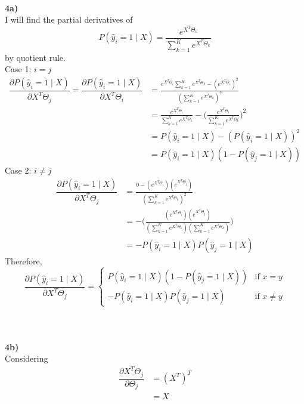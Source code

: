 \documentclass[12pt]{article}
\begin{document}
\paragraph{\\}
\textbf{4a)}\\
I will find the partial derivatives of 
\[P(\hat{y}_{i} = 1\mid X) = \frac{e^{X^{T}\Theta_{i}}}{\sum_{k=1}^{K}e^{X^{T}\Theta_{k}}} \]
by quotient rule.\\[0.1in]
Case 1: $i = j$\\
\begin{align*}
\dfrac{\partial P(\hat{y}_{i} = 1\mid X)}{\partial X^{T}\Theta_{j}}= \dfrac{\partial P(\hat{y}_{i} = 1\mid X)}{\partial X^{T}\Theta_{i}} &= \frac{e^{X^{T}\Theta_{i}}\sum_{k=1}^{K}e^{X^{T}\Theta_{k}} - (e^{X^{T}\Theta_{i}})^{2}}{(\sum_{k=1}^{K}e^{X^{T}\Theta_{k}})^{2}}\\
&= \frac{e^{X^{T}\Theta_{i}}}{\sum_{k=1}^{K}e^{X^{T}\Theta_{k}}} - \Bigg(\frac{e^{X^{T}\Theta_{i}}}{\sum_{k=1}^{K}e^{X^{T}\Theta_{k}}}\Bigg)^{2}\\
&=  P(\hat{y}_{i} = 1\mid X) - ( P(\hat{y}_{i} = 1\mid X))^{2}\\
&=  P(\hat{y}_{i} = 1\mid X)(1 -  P(\hat{y}_{j} = 1\mid X))
\end{align*}
Case 2: $i \neq j$
\begin{align*}
\dfrac{\partial P(\hat{y}_{i} = 1\mid X)}{\partial X^{T}\Theta_{j}} &= \frac{0 - (e^{X^{T}\Theta_{i}})(e^{X^{T}\Theta_{j}})}{(\sum_{k=1}^{K}e^{X^{T}\Theta_{k}})^{2}}\\
&=  - \Bigg(\frac{(e^{X^{T}\Theta_{i}})(e^{X^{T}\Theta_{j}})}{(\sum_{k=1}^{K}e^{X^{T}\Theta_{k}})(\sum_{k=1}^{K}e^{X^{T}\Theta_{k}})}\Bigg)\\
&= - P(\hat{y}_{i} = 1\mid X) P(\hat{y}_{j} = 1\mid X)
\end{align*}
Therefore,\\
\[ \dfrac{\partial P(\hat{y}_{i} = 1\mid X)}{\partial X^{T}\Theta_{j}} = \begin{cases} P(\hat{y}_{i} = 1\mid X)(1 -  P(\hat{y}_{j} = 1\mid X)) &\text{if } x = y\\- P(\hat{y}_{i} = 1\mid X) P(\hat{y}_{j} = 1\mid X) &\text{if } x \neq y \end{cases}\]\paragraph{\\}
\textbf{4b)}\\
Considering
\begin{align*}
\dfrac{\partial X^{T}\Theta_{j}}{\partial \Theta_{j}} &= (X^{T})^{T}\\
&= X
\end{align*}
\end{document}
